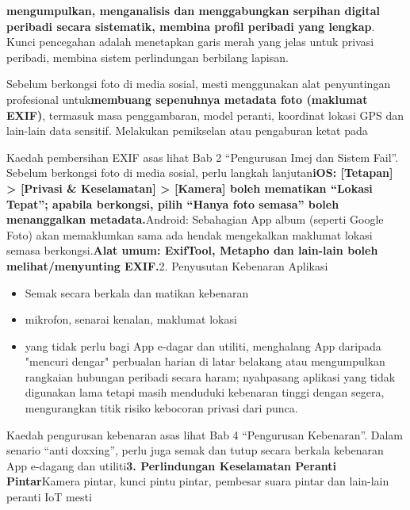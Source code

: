 
\textbf{mengumpulkan, menganalisis dan menggabungkan serpihan digital peribadi secara sistematik, membina profil peribadi yang lengkap}. Kunci pencegahan adalah menetapkan garis merah yang jelas untuk privasi peribadi, membina sistem perlindungan berbilang lapisan.


Sebelum berkongsi foto di media sosial, mesti menggunakan alat penyuntingan profesional untuk\textbf{membuang sepenuhnya metadata foto (maklumat EXIF)}, termasuk masa penggambaran, model peranti, koordinat lokasi GPS dan lain-lain data sensitif. Melakukan pemikselan atau pengaburan ketat pada


Kaedah pembersihan EXIF asas lihat Bab 2 “Pengurusan Imej dan Sistem Fail”. Sebelum berkongsi foto di media sosial, perlu langkah lanjutan\textbf{iOS: [Tetapan] > [Privasi \& Keselamatan] > [Kamera] boleh mematikan “Lokasi Tepat”; apabila berkongsi, pilih “Hanya foto semasa” boleh menanggalkan metadata.}Android: Sebahagian App album (seperti Google Foto) akan memaklumkan sama ada hendak mengekalkan maklumat lokasi semasa berkongsi.\textbf{Alat umum: ExifTool, Metapho dan lain-lain boleh melihat/menyunting EXIF.}2. Penyusutan Kebenaran Aplikasi

\begin{itemize}
  \item Semak secara berkala dan matikan kebenaran
  \item mikrofon, senarai kenalan, maklumat lokasi
  \item yang tidak perlu bagi App e-dagar dan utiliti, menghalang App daripada "mencuri dengar" perbualan harian di latar belakang atau mengumpulkan rangkaian hubungan peribadi secara haram; nyahpasang aplikasi yang tidak digunakan lama tetapi masih menduduki kebenaran tinggi dengan segera, mengurangkan titik risiko kebocoran privasi dari punca.
\end{itemize}


Kaedah pengurusan kebenaran asas lihat Bab 4 “Pengurusan Kebenaran”. Dalam senario “anti doxxing”, perlu juga semak dan tutup secara berkala kebenaran App e-dagang dan utiliti\textbf{3. Perlindungan Keselamatan Peranti Pintar}Kamera pintar, kunci pintu pintar, pembesar suara pintar dan lain-lain peranti IoT mesti

